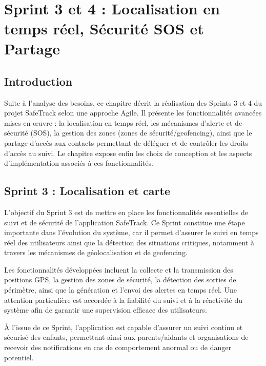 ﻿﻿\chapter{Sprint 3 et 4 : Localisation en temps réel, Sécurité SOS et Partage}
\label{chap_realisation2}

\minitoc
\newpage

\DeclareRobustCommand{\greencheck}{%
	\tikz\fill[scale=0.4, color=green]
	(0,.35) -- (.25,0) -- (1,.7) -- (.25,.15) -- cycle;%
}

\section*{Introduction}
Suite à l'analyse des besoins, ce chapitre décrit la réalisation des Sprints 3 et 4 du projet SafeTrack selon une approche Agile. Il présente les fonctionnalités avancées mises en œuvre : la localisation en temps réel, les mécanismes d'alerte et de sécurité (SOS), la gestion des zones (zones de sécurité/geofencing), ainsi que le partage d'accès aux contacts permettant de déléguer et de contrôler les droits d'accès au suivi. Le chapitre expose enfin les choix de conception et les aspects d'implémentation associés à ces fonctionnalités.

\section{Sprint 3 : Localisation et carte}

L’objectif du Sprint 3 est de mettre en place les fonctionnalités essentielles de suivi et de sécurité de l’application SafeTrack. Ce Sprint constitue une étape importante dans l’évolution du système, car il permet d’assurer le suivi en temps réel des utilisateurs ainsi que la détection des situations critiques, notamment à travers les mécanismes de géolocalisation et de geofencing.

Les fonctionnalités développées incluent la collecte et la transmission des positions GPS, la gestion des zones de sécurité, la détection des sorties de périmètre, ainsi que la génération et l’envoi des alertes en temps réel. Une attention particulière est accordée à la fiabilité du suivi et à la réactivité du système afin de garantir une supervision efficace des utilisateurs.

À l’issue de ce Sprint, l’application est capable d’assurer un suivi continu et sécurisé des enfants, permettant ainsi aux parents/aidants et organisations de recevoir des notifications en cas de comportement anormal ou de danger potentiel.

